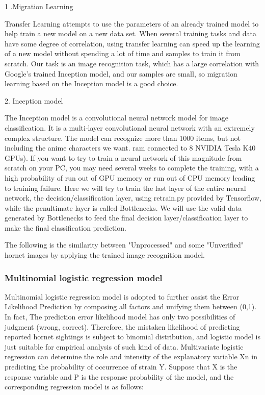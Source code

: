 \documentclass{mcmthesis}
\begin{document}
1 .Migration Learning

Transfer Learning attempts to use the parameters of an already trained model to help train a new model on a new data set. When several training tasks and data have some degree of correlation, using transfer learning can speed up the learning of a new model without spending a lot of time and samples to train it from scratch. Our task is an image recognition task, which has a large correlation with Google's trained Inception model, and our samples are small, so migration learning based on the Inception model is a good choice.

2. Inception model

The Inception model is a convolutional neural network model for image classification. It is a multi-layer convolutional neural network with an extremely complex structure. The model can recognize more than 1000 items, but not including the anime characters we want. ram connected to 8 NVIDIA Tesla K40 GPUs). If you want to try to train a neural network of this magnitude from scratch on your PC, you may need several weeks to complete the training, with a high probability of run out of GPU memory or run out of CPU memory leading to training failure. Here we will try to train the last layer of the entire neural network, the decision/classification layer, using retrain.py provided by Tensorflow, while the penultimate layer is called Bottlenecks. We will use the valid data generated by Bottlenecks to feed the final decision layer/classification layer to make the final classification prediction.

The following is the similarity between "Unprocessed" and some "Unverified" hornet images by applying the trained image recognition model.

\subsubsection{Multinomial logistic regression model}

Multinomial logistic regression model is adopted to further assist the Error Likelihood Prediction by composing all factors and unifying them between (0,1). In fact, The prediction error likelihood model has only two possibilities of judgment (wrong, correct). Therefore, the mistaken likelihood of predicting reported hornet sightings is subject to binomial distribution, and logistic model is just suitable for empirical analysis of such kind of data. Multivariate logistic regression can determine the role and intensity of the explanatory variable Xn in predicting the probability of occurrence of strain Y. Suppose that X is the response variable and P is the response probability of the model, and the corresponding regression model is as follows:
\end{document}
